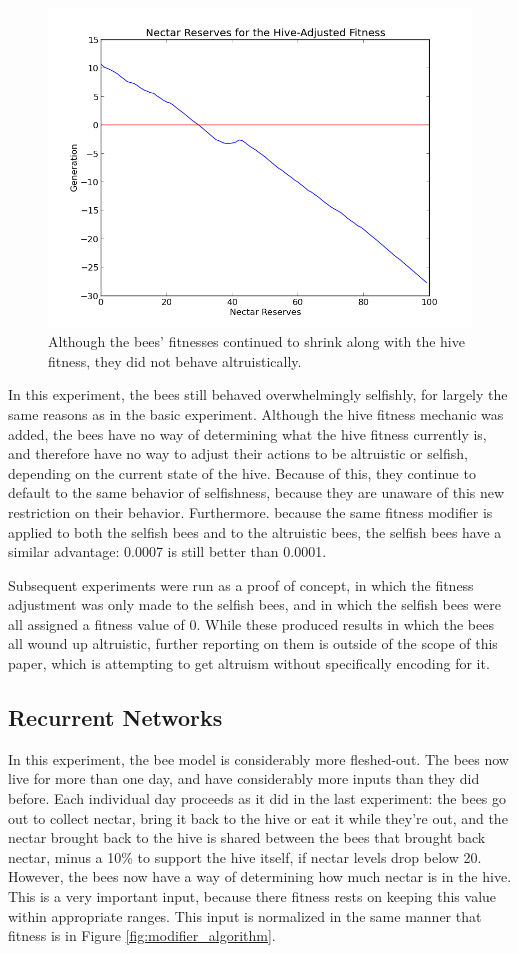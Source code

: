 \documentclass[twoside]{article}
\begin{document}
\begin{multicols}{2}
			\begin{figure}[H]
				\begin{center}
					\includegraphics[width=.5\textwidth]{results/hive_fitness_res.png}
				\end{center}
				\caption{Although the bees' fitnesses continued to shrink along with the hive fitness, they did not behave altruistically.}
				\label{fig:hive_fitness_reserves}
			\end{figure}

			In this experiment, the bees still behaved overwhelmingly selfishly, for largely the same reasons as in the basic experiment. Although the hive fitness mechanic was added, the bees have no way of determining what the hive fitness currently is, and therefore have no way to adjust their actions to be altruistic or selfish, depending on the current state of the hive. Because of this, they continue to default to the same behavior of selfishness, because they are unaware of this new restriction on their behavior. Furthermore. because the same fitness modifier is applied to both the selfish bees and to the altruistic bees, the selfish bees have a similar advantage: 0.0007 is still better than 0.0001.

			Subsequent experiments were run as a proof of concept, in which the fitness adjustment was only made to the selfish bees, and in which the selfish bees were all assigned a fitness value of 0. While these produced results in which the bees all wound up altruistic, further reporting on them is outside of the scope of this paper, which is attempting to get altruism without specifically encoding for it.

		\subsection{Recurrent Networks} %
			\label{sub:recurrent_networks}


			In this experiment, the bee model is considerably more fleshed-out. The bees now live for more than one day, and have considerably more inputs than they did before. Each individual day proceeds as it did in the last experiment: the bees go out to collect nectar, bring it back to the hive or eat it while they're out, and the nectar brought back to the hive is shared between the bees that brought back nectar, minus a 10\% to support the hive itself, if nectar levels drop below 20. However, the bees now have a way of determining how much nectar is in the hive. This is a very important input, because there fitness rests on keeping this value within appropriate ranges. This input is normalized in the same manner that fitness is in Figure \ref{fig:modifier_algorithm}.


\end{multicols}
\end{document}
